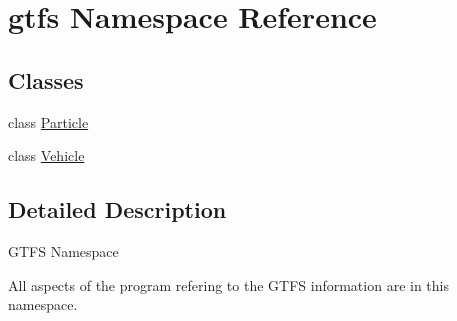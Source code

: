 \hypertarget{namespacegtfs}{}\section{gtfs Namespace Reference}
\label{namespacegtfs}
\subsection*{Classes}
\begin{DoxyCompactItemize}
\item 
class \hyperlink{classgtfs_1_1Particle}{Particle}
\item 
class \hyperlink{classgtfs_1_1Vehicle}{Vehicle}
\end{DoxyCompactItemize}


\subsection{Detailed Description}
G\+T\+FS Namespace

All aspects of the program refering to the G\+T\+FS information are in this namespace. 